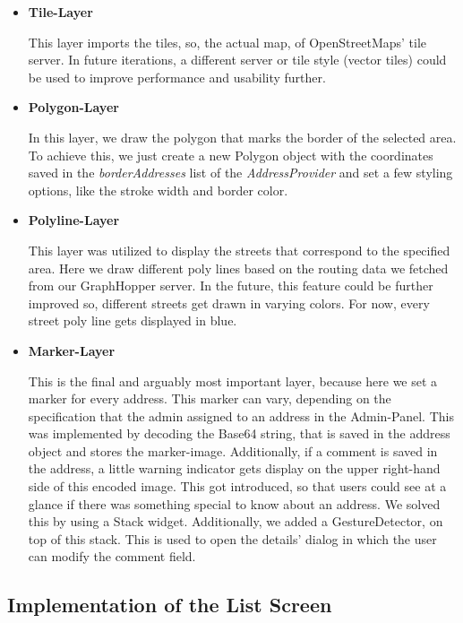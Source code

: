 \begin{itemize}
  \item \textbf{Tile-Layer}
  
  This layer imports the tiles, so, the actual map, of OpenStreetMaps' tile server. In future iterations, a different server or tile style (vector tiles) could be used to improve performance and usability further.

  \item \textbf{Polygon-Layer}
  
  In this layer, we draw the polygon that marks the border of the selected area. To achieve this, we just create a new Polygon object with the coordinates saved in the \textit{borderAddresses} list of the \textit{AddressProvider} and set a few styling options, like the stroke width and border color.

  \item \textbf{Polyline-Layer}
  
  This layer was utilized to display the streets that correspond to the specified area. Here we draw different poly lines based on the routing data we fetched from our GraphHopper server. In the future, this feature could be further improved so, different streets get drawn in varying colors. For now, every street poly line gets displayed in blue. 

  \item \textbf{Marker-Layer}
  
  This is the final and arguably most important layer, because here we set a marker for every address. This marker can vary, depending on the specification that the admin assigned to an address in the Admin-Panel. This was implemented by decoding the Base64 string, that is saved in the address object and stores the marker-image. Additionally, if a comment is saved in the address, a little warning indicator gets display on the upper right-hand side of this encoded image. This got introduced, so that users could see at a glance if there was something special to know about an address. We solved this by using a Stack widget. Additionally, we added a GestureDetector, on top of this stack. This is used to open the details' dialog in which the user can modify the comment field. 
\end{itemize}

\subsection{Implementation of the List Screen}

